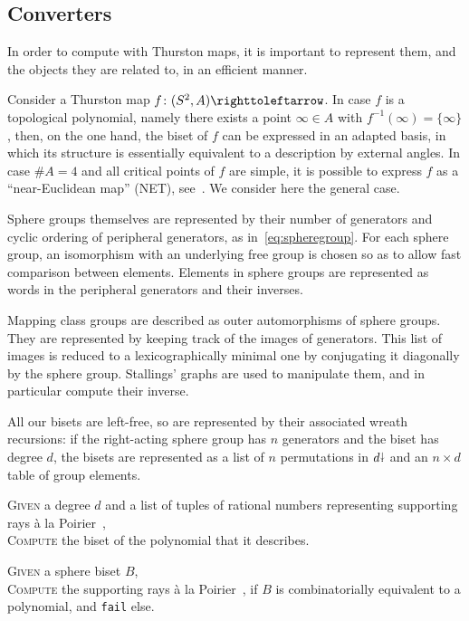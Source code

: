 \documentclass{amsart}
\begin{document}
\subsection{Converters}
In order to compute with Thurston maps, it is important to represent
them, and the objects they are related to, in an efficient manner.

Consider a Thurston map $f\colon(S^2,A)\selfmap$. In case $f$ is a
topological polynomial, namely there exists a point $\infty\in A$ with
$f^{-1}(\infty)=\{\infty\}$, then, on the one hand, the biset of $f$
can be expressed in an adapted basis, in which its structure is
essentially equivalent to a description by external angles. In case
$\#A=4$ and all critical points of $f$ are simple, it is possible to
express $f$ as a ``near-Euclidean map'' (NET),
see~\cite{cannon-floyd-parry-pilgrim:net}. We consider here the
general case.

Sphere groups themselves are represented by their number of generators
and cyclic ordering of peripheral generators, as
in~\eqref{eq:spheregroup}. For each sphere group, an isomorphism with
an underlying free group is chosen so as to allow fast comparison
between elements. Elements in sphere groups are represented as words
in the peripheral generators and their inverses.

Mapping class groups are described as outer automorphisms of sphere
groups. They are represented by keeping track of the images of
generators. This list of images is reduced to a lexicographically
minimal one by conjugating it diagonally by the sphere
group. Stallings' graphs are used to manipulate them, and in
particular compute their inverse.

All our bisets are left-free, so are represented by their associated
wreath recursions: if the right-acting sphere group has $n$ generators
and the biset has degree $d$, the bisets are represented as a list of
$n$ permutations in $d{\stackrel{\downarrow}{\smash.}}$ and an $n\times d$ table of group
elements.

\begin{algo}\label{algo:angle2biset}
  \textsc{Given} a degree $d$ and a list of tuples of rational numbers representing supporting rays \`a la Poirier~\cite{poirier:portraits},\\
  \textsc{Compute} the biset of the polynomial that it describes.
\end{algo}

\begin{algo}\label{algo:biset2angle}
  \textsc{Given} a sphere biset $B$,\\
  \textsc{Compute} the supporting rays \`a la Poirier~\cite{poirier:portraits}, if $B$ is combinatorially equivalent to a polynomial, and \texttt{fail} else.
\end{algo}
\end{document}
